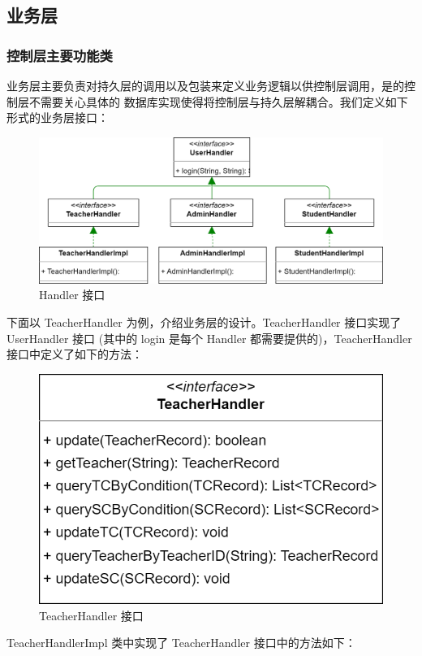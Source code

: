 \documentclass[12pt, a4paper]{article}
\begin{document}
\subsection{业务层}
\subsubsection{控制层主要功能类}
业务层主要负责对持久层的调用以及包装来定义业务逻辑以供控制层调用，是的控制层不需要关心具体的
数据库实现使得将控制层与持久层解耦合。我们定义如下形式的业务层接口：
\begin{figure}[H]
	\centering
	\includegraphics[width = 0.8 \textwidth]{ServiceInterface.png}
	\caption{Handler 接口}
\end{figure}
下面以 TeacherHandler 为例，介绍业务层的设计。TeacherHandler 接口实现了 UserHandler 接口
(其中的 login 是每个 Handler 都需要提供的)，TeacherHandler 接口中定义了如下的方法：
\begin{figure}[H]
	\centering
	\includegraphics[width = 0.6 \textwidth]{TeacherHandler.png}
	\caption{TeacherHandler 接口}
\end{figure}
TeacherHandlerImpl 类中实现了 TeacherHandler 接口中的方法如下：
\end{document}
